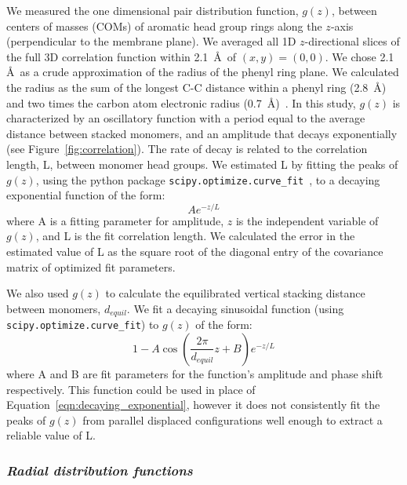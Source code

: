 \documentclass[journal=jpcbfk,manuscript=article]{achemso}
\begin{document}
  We measured the one dimensional pair distribution function, $g(z)$, between centers 
  of masses (COMs) of aromatic head group rings along the $z$-axis (perpendicular to
  the membrane plane). We averaged all 1D $z$-directional slices of the full 3D 
  correlation function within 2.1~\AA~of $(x, y)=(0, 0)$. We chose 2.1 \AA~as a crude 
  approximation of the radius of the phenyl ring plane. 
  We calculated the radius as the sum of the longest C-C distance within a phenyl 
  ring (2.8~\AA) and two times the carbon atom electronic radius (0.7~\AA)~\cite{slater_atomic_1964}.
  In this study, $g(z)$ is characterized by an oscillatory function with a period equal to the
  average distance between stacked monomers, and an amplitude that decays exponentially
  (see Figure~\ref{fig:correlation}). The rate of decay is related to the correlation 
  length, L, between monomer head groups. We estimated L by fitting the peaks of $g(z)$,
  using the python package \texttt{scipy.optimize.curve\_fit}~\cite{oliphant_python_2007},
  to a decaying exponential function of the form:
  \begin{equation}
  	Ae^{-z/L}
  	\label{eqn:decaying_exponential}
  \end{equation}
  where A is a fitting parameter for amplitude, $z$ is the independent variable of $g(z)$, 
  and L is the fit correlation length. We calculated the error in the estimated value
  of L as the square root of the diagonal entry of the covariance matrix of 
  optimized fit parameters.
  
  We also used $g(z)$ to calculate the equilibrated vertical stacking distance between
  monomers, $d_{equil}$. We fit a decaying sinusoidal function (using \texttt{scipy.optimize.curve\_fit}) to 
  $g(z)$ of the form:
  \begin{equation}
  	1 - A\cos\left(\frac{2\pi}{\mathit{d}_{equil}}z + B\right)e^{-z/L}
  	\label{eqn:decaying_sinusoid}
  \end{equation}
  where A and B are fit parameters for the function's amplitude and phase shift respectively.
  This function could be used in place of Equation~\ref{eqn:decaying_exponential}, however
  it does not consistently fit the peaks of $g(z)$ from parallel displaced configurations 
  well enough to extract a reliable value of L.
  
  \subsubsection{\textit{Radial distribution functions}}\label{method:rdfs}
\end{document}

